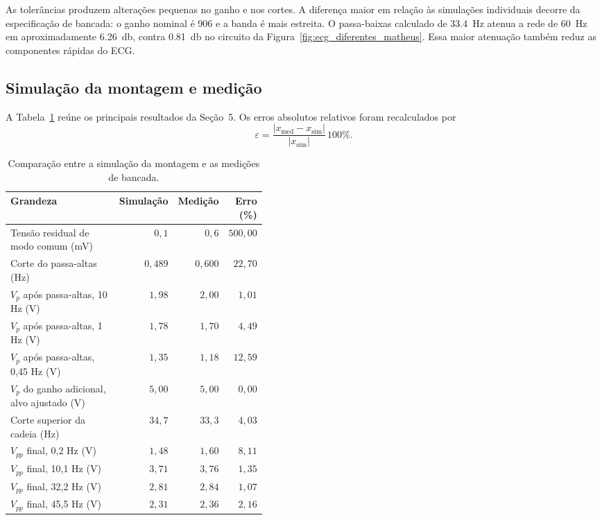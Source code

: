 \documentclass[11pt,a4paper]{article}
\begin{document}
As tolerâncias produzem alterações pequenas no ganho e nos cortes. A diferença maior em relação às simulações individuais decorre da especificação de bancada: o ganho nominal é 906 e a banda é mais estreita. O passa-baixas calculado de \SI{33,4}{\hertz} atenua a rede de \SI{60}{\hertz} em aproximadamente \SI{6,26}{\decibel}, contra \SI{0,81}{\decibel} no circuito da Figura~\ref{fig:ecg_diferentes_matheus}. Essa maior atenuação também reduz as componentes rápidas do ECG.

\subsection{Simulação da montagem e medição}

A Tabela~\ref{tab:discussao_bancada_r4} reúne os principais resultados da Seção~5. Os erros absolutos relativos foram recalculados por
\begin{equation}
\varepsilon=\frac{|x_{\mathrm{med}}-x_{\mathrm{sim}}|}{|x_{\mathrm{sim}}|}\,100\%.
\label{eq:erro_discussao_r4}
\end{equation}

\begin{table}[H]
\centering
\caption{Comparação entre a simulação da montagem e as medições de bancada.}
\label{tab:discussao_bancada_r4}
\begingroup
\small
\setlength{\tabcolsep}{5pt}
\begin{tabular}{@{}p{0.43\linewidth}rrr@{}}
\toprule
\textbf{Grandeza} & \textbf{Simulação} & \textbf{Medição} & \textbf{Erro (\%)} \\
\midrule
Tensão residual de modo comum (mV) & $0,1$ & $0,6$ & $500,00$ \\
Corte do passa-altas (Hz) & $0,489$ & $0,600$ & $22,70$ \\
$V_p$ após passa-altas, 10 Hz (V) & $1,98$ & $2,00$ & $1,01$ \\
$V_p$ após passa-altas, 1 Hz (V) & $1,78$ & $1,70$ & $4,49$ \\
$V_p$ após passa-altas, 0,45 Hz (V) & $1,35$ & $1,18$ & $12,59$ \\
$V_p$ do ganho adicional, alvo ajustado (V) & $5,00$ & $5,00$ & $0,00$ \\
Corte superior da cadeia (Hz) & $34,7$ & $33,3$ & $4,03$ \\
$V_{pp}$ final, 0,2 Hz (V) & $1,48$ & $1,60$ & $8,11$ \\
$V_{pp}$ final, 10,1 Hz (V) & $3,71$ & $3,76$ & $1,35$ \\
$V_{pp}$ final, 32,2 Hz (V) & $2,81$ & $2,84$ & $1,07$ \\
$V_{pp}$ final, 45,5 Hz (V) & $2,31$ & $2,36$ & $2,16$ \\
\bottomrule
\end{tabular}
\endgroup
\end{table}
\end{document}
